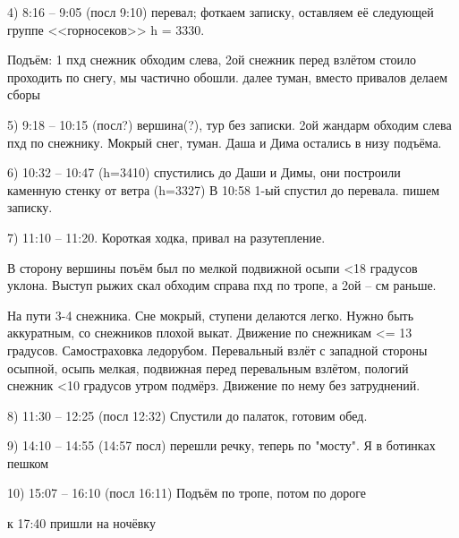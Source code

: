 4) 8:16 -- 9:05 (посл 9:10) перевал; фоткаем записку, оставляем её следующей группе <<горносеков>> h = 3330.

Подъём: 1 пхд снежник обходим слева, 2ой снежник перед взлётом стоило проходить по снегу, мы частично обошли. далее туман, вместо привалов делаем сборы

5) 9:18 -- 10:15 (посл?) вершина(?), тур без записки. 2ой жандарм обходим слева пхд по снежнику. Мокрый снег, туман. Даша и Дима остались в низу подъёма.

6) 10:32 -- 10:47 (h=3410) спустились до Даши и Димы, они построили каменную стенку от ветра (h=3327) В 10:58 1-ый спустил до перевала. пишем записку.

7) 11:10 -- 11:20. Короткая ходка, привал на разутепление.

В сторону вершины поъём был по мелкой подвижной осыпи <18 градусов уклона. Выступ рыжих скал обходим справа пхд по тропе, а 2ой -- см раньше.

На пути 3-4 снежника. Сне мокрый, ступени делаются легко. Нужно быть аккуратным, со снежников плохой выкат. Движение по снежникам <= 13 градусов. Самостраховка ледорубом. Перевальный взлёт с западной стороны осыпной, осыпь мелкая, подвижная перед перевальным взлётом, пологий снежник <10 градусов утром подмёрз. Движение по нему без затруднений.

8) 11:30 -- 12:25 (посл 12:32) Спустили до палаток, готовим обед.

9) 14:10 -- 14:55 (14:57 посл) перешли речку, теперь по "мосту". Я в ботинках пешком

10) 15:07 -- 16:10 (посл 16:11) Подъём по тропе, потом по дороге

к 17:40 пришли на ночёвку


    \FloatBarrier
